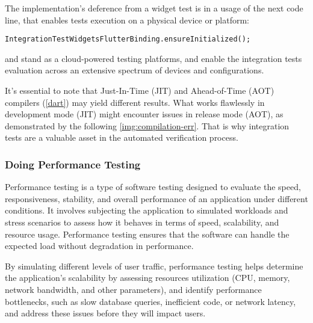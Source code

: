 \noindent The implementation's deference from a widget test is in a usage of the next code line, that enables tests 
execution on a physical device or platform:
\begin{lstlisting}
IntegrationTestWidgetsFlutterBinding.ensureInitialized();
\end{lstlisting}

 and  stand as a cloud-powered testing platforms, and enable the integration tests
evaluation across an extensive spectrum of devices and configurations.

It's essential to note that Just-In-Time (JIT) and Ahead-of-Time (AOT) compilers (\ref{dart}) may yield different 
results. What works flawlessly in development mode (JIT) might encounter issues in release mode (AOT), as 
demonstrated by the following \cref{img:compilation-err}. That is why integration tests are a valuable asset in the 
automated verification process.


\subsubsection{Doing Performance Testing}

Performance testing is a type of software testing designed to evaluate the speed, responsiveness, stability, and 
overall performance of an application under different conditions. It involves subjecting the application to 
simulated workloads and stress scenarios to assess how it behaves in terms of speed, scalability, and resource usage. 
Performance testing ensures that the software can handle the expected load without degradation in performance.

By simulating different levels of user traffic, performance testing helps determine the application's scalability by
assessing resources utilization (CPU, memory, network bandwidth, and other parameters), and identify performance 
bottlenecks, such as slow database queries, inefficient code, or network latency, and address these issues before 
they will impact users.

